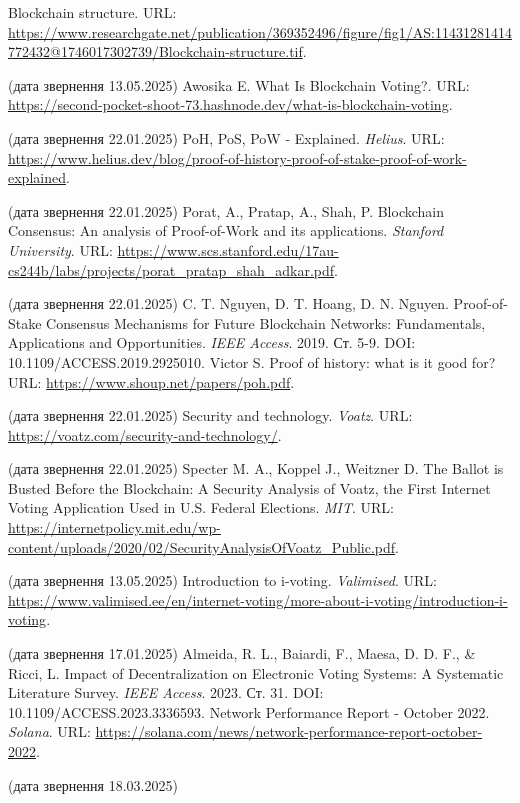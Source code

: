 \documentclass[14pt]{extreport}
\begin{document}
  \renewcommand\bibname{\MakeUppercase{Список літератури}}
  \begin{thebibliography}{99}
     Blockchain structure. URL: \url{https://www.researchgate.net/publication/369352496/figure/fig1/AS:11431281414772432@1746017302739/Blockchain-structure.tif}.

    (дата звернення 13.05.2025)
     Awosika E. What Is Blockchain Voting?. URL: \url{https://second-pocket-shoot-73.hashnode.dev/what-is-blockchain-voting}.

    (дата звернення 22.01.2025)
     PoH, PoS, PoW - Explained. \textit{Helius}. URL: \url{https://www.helius.dev/blog/proof-of-history-proof-of-stake-proof-of-work-explained}.
    
    (дата звернення 22.01.2025)
     Porat, A., Pratap, A., Shah, P. Blockchain Consensus: An analysis of Proof-of-Work and its applications. \textit{Stanford University}. URL: \url{https://www.scs.stanford.edu/17au-cs244b/labs/projects/porat_pratap_shah_adkar.pdf}.
    
    (дата звернення 22.01.2025)
     C. T. Nguyen, D. T. Hoang, D. N. Nguyen. Proof-of-Stake Consensus Mechanisms for Future Blockchain Networks: Fundamentals, Applications and Opportunities. \textit{IEEE Access}. 2019. Ст. 5-9. DOI: 10.1109/ACCESS.2019.2925010.
     Victor S. Proof of history: what is it good for? URL: \url{https://www.shoup.net/papers/poh.pdf}.
    
    (дата звернення 22.01.2025)
     Security and technology. \textit{Voatz}. URL: \url{https://voatz.com/security-and-technology/}.
    
    (дата звернення 22.01.2025)
     Specter M. A., Koppel J., Weitzner D. The Ballot is Busted Before the Blockchain: A Security Analysis of Voatz, the First Internet Voting Application Used in U.S. Federal Elections. \textit{MIT}. URL: \url{https://internetpolicy.mit.edu/wp-content/uploads/2020/02/SecurityAnalysisOfVoatz_Public.pdf}.

    (дата звернення 13.05.2025)
     Introduction to i-voting. \textit{Valimised}. 
    URL: \url{https://www.valimised.ee/en/internet-voting/more-about-i-voting/introduction-i-voting}.
    
    (дата звернення 17.01.2025)
     Almeida, R. L., Baiardi, F., Maesa, D. D. F., \& Ricci, L. Impact of Decentralization on Electronic Voting Systems: A Systematic Literature Survey. \textit{IEEE Access}. 2023. Ст. 31. DOI: 10.1109/ACCESS.2023.3336593.
     Network Performance Report - October 2022. \textit{Solana}. URL: \url{https://solana.com/news/network-performance-report-october-2022}.
    
    (дата звернення 18.03.2025)
  \end{thebibliography}
  
\end{document}
